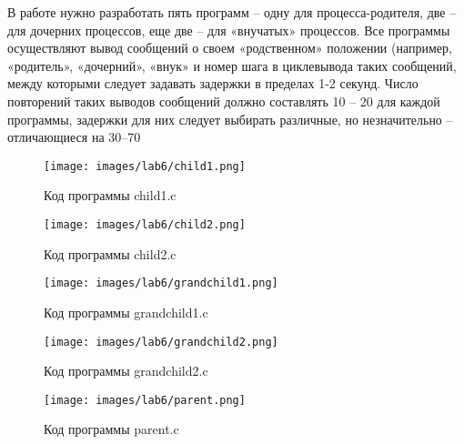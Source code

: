 \documentclass[14pt, a4paper]{article}
\begin{document}
    В работе нужно разработать пять программ – одну для процесса-родителя, две – для дочерних процессов, еще две – для «внучатых» процессов. Все программы осуществляют вывод сообщений о своем «родственном» положении (например, «родитель», «дочерний», «внук» и номер шага в циклевывода таких сообщений, между которыми следует задавать задержки в пределах 1-2 секунд. Число повторений таких выводов сообщений должно составлять 10 – 20 для каждой программы, задержки для них следует выбирать различные, но незначительно – отличающиеся на 30–70%

    \begin{figure}[H]
        \centering
        \texttt{[image: images/lab6/child1.png]}
        \caption{Код программы child1.c}
    \end{figure}
    
    \begin{figure}[H]
        \centering
        \texttt{[image: images/lab6/child2.png]}
        \caption{Код программы child2.c}
    \end{figure}
    
    \begin{figure}[H]
        \centering
        \texttt{[image: images/lab6/grandchild1.png]}
        \caption{Код программы grandchild1.c}
    \end{figure}
    
    \begin{figure}[H]
        \centering
        \texttt{[image: images/lab6/grandchild2.png]}
        \caption{Код программы grandchild2.c}
    \end{figure}
    
    \begin{figure}[H]
        \centering
        \texttt{[image: images/lab6/parent.png]}
        \caption{Код программы parent.c}
    \end{figure}
\end{document}
